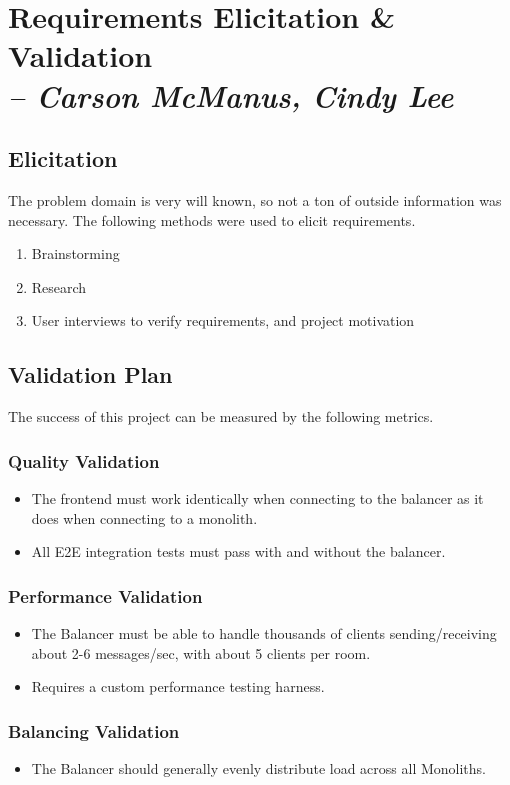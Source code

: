 \chapter{Requirements Elicitation \& Validation \\
  \small{\textit{-- Carson McManus, Cindy Lee}}
  \label{Chapter::ElicitationValidation}}

\section{Elicitation}

The problem domain is very will known, so not a ton of outside information was necessary. The following methods were used to elicit requirements.

\begin{enumerate}
	\item Brainstorming
	\item Research
	\item User interviews to verify requirements, and project motivation
\end{enumerate}

\section{Validation Plan}

The success of this project can be measured by the following metrics.

\subsection{Quality Validation}

\begin{itemize}
	\item The frontend must work identically when connecting to the balancer as it does when connecting to a monolith.
	\item All E2E integration tests must pass with and without the balancer.
\end{itemize}

\subsection{Performance Validation}

\begin{itemize}
	\item The Balancer must be able to handle thousands of clients sending/receiving about 2-6 messages/sec, with about 5 clients per room.
	\item Requires a custom performance testing harness.
\end{itemize}

\subsection{Balancing Validation}

\begin{itemize}
	\item The Balancer should generally evenly distribute load across all Monoliths.
\end{itemize}